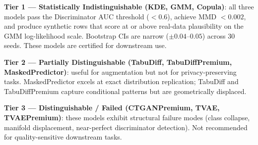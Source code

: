 \documentclass[12pt,a4paper]{article}
\begin{document}
\begin{tcolorbox}[successbox, title={Summary Verdict}]
\textbf{Tier 1 --- Statistically Indistinguishable (KDE, GMM, Copula)}: all three models pass the Discriminator AUC threshold ($< 0.6$), achieve MMD $< 0.002$, and produce synthetic rows that score at or above real-data plausibility on the GMM log-likelihood scale. Bootstrap CIs are narrow ($\pm 0.04$--$0.05$) across 30 seeds. These models are certified for downstream use.

\medskip
\textbf{Tier 2 --- Partially Distinguishable (TabuDiff, TabuDiffPremium, MaskedPredictor)}: useful for augmentation but not for privacy-preserving tasks. MaskedPredictor excels at exact distribution replication; TabuDiff and TabuDiffPremium capture conditional patterns but are geometrically displaced.

\medskip
\textbf{Tier 3 --- Distinguishable / Failed (CTGANPremium, TVAE, TVAEPremium)}: these models exhibit structural failure modes (class collapse, manifold displacement, near-perfect discriminator detection). Not recommended for quality-sensitive downstream tasks.
\end{tcolorbox}
\end{document}
